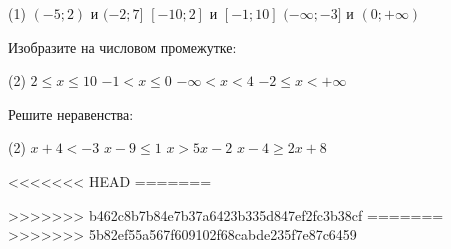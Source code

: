 \begin{consultation}[number=1]
\begin{listofex}
		\begin{tasks}(1)
			\task \( (-5;2) \) и \( (-2;7] \)
			\task \( [-10;2] \) и \( [-1;10] \)
			\task \( (-\infty;-3] \) и \( (0;+\infty) \)
		\end{tasks}
		\item Изобразите на числовом промежутке:
		\begin{tasks}(2)
			\task \( 2\leq x\leq 10\)
			\task \( -1< x\leq 0\)
			\task \( -\infty < x< 4\)
			\task \( -2\leq x<+\infty \)
		\end{tasks}
		\item Решите неравенства:
		\begin{tasks}(2)
			\task \( x+4<-3 \)
			\task \( x-9\leq 1 \)
			\task \( x>5x-2\)
			\task \( x-4\geq 2x+8\)
		\end{tasks}
	\end{listofex}
\end{consultation}
<<<<<<< HEAD
=======
	\begin{consultation}
		\begin{listofex}
			\item 
		\end{listofex}
	\end{consultation}
>>>>>>> b462c8b7b84e7b37a6423b335d847ef2fc3b38cf
=======
>>>>>>> 5b82ef55a567f609102f68cabde235f7e87c6459
